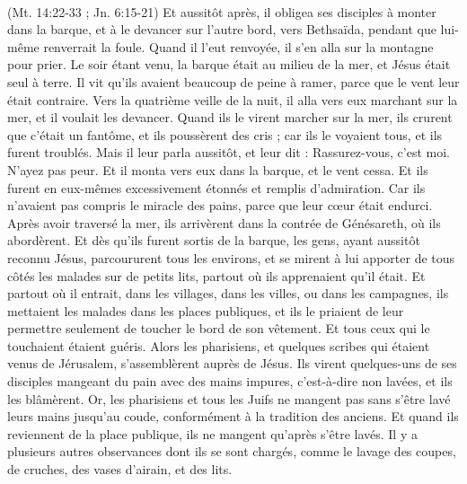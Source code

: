 \begin{multicols}{2}
{\\(Mt. 14:22-33 ; Jn. 6:15-21)}
Et aussitôt après, il obligea ses disciples à monter dans la barque, et à le devancer sur l’autre bord, vers Bethsaïda, pendant que lui-même renverrait la foule.
Quand il l’eut renvoyée, il s'en alla sur la montagne pour prier.
Le soir étant venu, la barque était au milieu de la mer, et Jésus était seul à terre.
Il vit qu'ils avaient beaucoup de peine à ramer, parce que le vent leur était contraire. Vers la quatrième veille de la nuit, il alla vers eux marchant sur la mer, et il voulait les devancer.
Quand ils le virent marcher sur la mer, ils crurent que c’était un fantôme, et ils poussèrent des cris ;
car ils le voyaient tous, et ils furent troublés. Mais il leur parla aussitôt, et leur dit : Rassurez-vous, c'est moi. N’ayez pas peur.
Et il monta vers eux dans la barque, et le vent cessa. Et ils furent en eux-mêmes excessivement étonnés et remplis d’admiration.
Car ils n'avaient pas compris le miracle des pains, parce que leur cœur était endurci.
Après avoir traversé la mer, ils arrivèrent dans la contrée de Génésareth, où ils abordèrent.
Et dès qu’ils furent sortis de la barque, les gens, ayant aussitôt reconnu Jésus,
parcoururent tous les environs, et se mirent à lui apporter de tous côtés les malades sur de petits lits, partout où ils apprenaient qu'il était.
Et partout où il entrait, dans les villages, dans les villes, ou dans les campagnes, ils mettaient les malades dans les places publiques, et ils le priaient de leur permettre seulement de toucher le bord de son vêtement. Et tous ceux qui le touchaient étaient guéris.
\VerseOne{}Alors les pharisiens, et quelques scribes qui étaient venus de Jérusalem, s'assemblèrent auprès de Jésus.
Ils virent quelques-uns de ses disciples mangeant du pain avec des mains impures, c'est-à-dire non lavées, et ils les blâmèrent.
Or, les pharisiens et tous les Juifs ne mangent pas sans s’être lavé leurs mains jusqu’au coude, conformément à la tradition des anciens.
Et quand ils reviennent de la place publique, ils ne mangent qu’après s’être lavés{}. Il y a plusieurs autres observances dont ils se sont chargés, comme le lavage des coupes, de cruches, des vases d'airain, et des lits.

\end{multicols}
